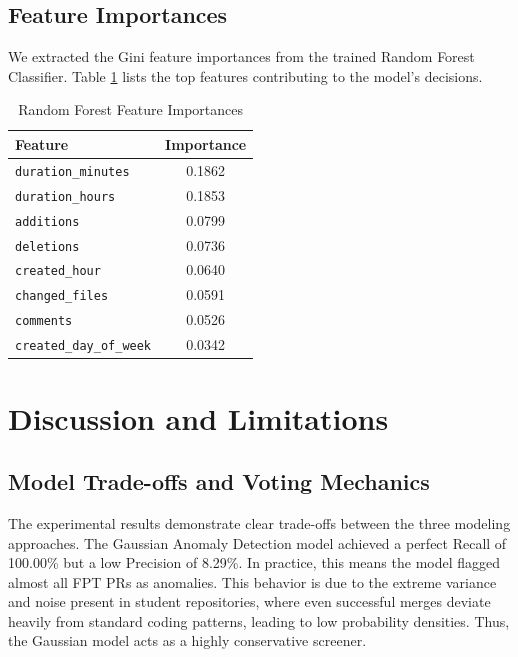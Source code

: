 \documentclass[conference]{IEEEtran}
\begin{document}
\subsection{Feature Importances}
We extracted the Gini feature importances from the trained Random Forest Classifier. Table \ref{tab:feature_importances} lists the top features contributing to the model's decisions.

\begin{table}[htbp]
\caption{Random Forest Feature Importances}
\begin{center}
\begin{tabular}{lc}
\toprule
\textbf{Feature} & \textbf{Importance} \\
\midrule
\texttt{duration\_minutes} & 0.1862 \\
\texttt{duration\_hours} & 0.1853 \\
\texttt{additions} & 0.0799 \\
\texttt{deletions} & 0.0736 \\
\texttt{created\_hour} & 0.0640 \\
\texttt{changed\_files} & 0.0591 \\
\texttt{comments} & 0.0526 \\
\texttt{created\_day\_of\_week} & 0.0342 \\
\bottomrule
\end{tabular}
\label{tab:feature_importances}
\end{center}
\end{table}

\section{Discussion and Limitations}

\subsection{Model Trade-offs and Voting Mechanics}
The experimental results demonstrate clear trade-offs between the three modeling approaches. 
The Gaussian Anomaly Detection model achieved a perfect Recall of 100.00\% but a low Precision of 8.29\%. In practice, this means the model flagged almost all FPT PRs as anomalies. This behavior is due to the extreme variance and noise present in student repositories, where even successful merges deviate heavily from standard coding patterns, leading to low probability densities. Thus, the Gaussian model acts as a highly conservative screener.
\end{document}
